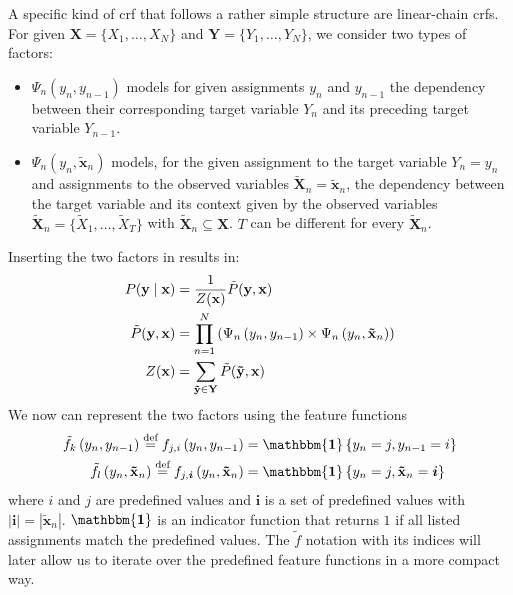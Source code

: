 A specific kind of \gls{crf} that follows a rather simple structure are \glspl{linear-chain crf}.
For given $\mathbf{X}=\{X_1,\dots,X_N\}$ and $\mathbf{Y}=\{Y_1,\dots,Y_N\}$, we consider two types of \glspl{factor}:
\begin{itemize}
  \item $\Psi_n(y_n,y_{n-1})$ models for given assignments $y_n$ and $y_{n-1}$ the dependency between their corresponding \gls{target variable} $Y_n$ and its preceding \gls{target variable} $Y_{n-1}$.
  \item $\Psi_n(y_n,\mathbf{\tilde{x}}_n)$ models, for the given assignment to the \gls{target variable} $Y_n=y_n$ and assignments to the observed variables $\mathbf{\tilde{X}}_n=\mathbf{\tilde{x}}_n$, the dependency between the \gls{target variable} and its context given by the \glspl{observed variable} $\mathbf{\tilde{X}}_n=\{\tilde{X}_1,\dots,\tilde{X}_T\}$ with $\mathbf{\tilde{X}}_n\subseteq\mathbf{X}$.
    $T$ can be different for every $\mathbf{\tilde{X}}_n$.
\end{itemize}
Inserting the two factors in  results in:
\begin{equation}
  \label{equ:linear-chain-crf-factor}
  \begin{split}
    P(\mathbf{y}\mid\mathbf{x}) & = \frac{1}{Z(\mathbf{x})}\tilde{P}(\mathbf{y},\mathbf{x}) \\
    \tilde{P}(\mathbf{y},\mathbf{x}) &= \prod_{n=1}^{N}\left(\Psi_n\left(\vphantom{\tilde{x}}y_n,y_{n-1}\right)\times\Psi_n\left(y_n,\mathbf{\tilde{x}}_n\right)\right) \\
    Z(\mathbf{x}) & = \sum_{\mathbf{\tilde{y}}\in\mathbf{Y}}\tilde{P}(\mathbf{\tilde{y}},\mathbf{x})
  \end{split}
\end{equation}
We now can represent the two \glspl{factor} using the \glspl{feature function}
\begin{equation}
  \label{equ:linear-chain-crf-feature-functions}
  \begin{split}
    \tilde{f}_k\left(\vphantom{\tilde{x}}y_n,y_{n-1}\right)\equalsdef f_{j,i}\left(\vphantom{\tilde{x}}y_n,y_{n-1}\right) & = \mathbf{\mathbbm{1}}\left\{\vphantom{\tilde{x}}y_n=j,y_{n-1}=i\right\}\\
    \tilde{f}_l\left(y_n,\mathbf{\tilde{x}}_n\right)\equalsdef f_{j,\bm{i}}\left( y_n,\mathbf{\tilde{x}}_n\right) & = \mathbf{\mathbbm{1}}\left\{y_n=j,\mathbf{\tilde{x}}_n=\bm{i}\right\}
  \end{split}
\end{equation}
where $i$ and $j$ are predefined values and $\bm{i}$ is a set of predefined values with $|\bm{i}|=|\mathbf{\tilde{x}}_n|$. $\mathbf{\mathbbm{1}}$ is an indicator function that returns $1$ if all listed assignments match the predefined values.
The $\tilde{f}$ notation with its indices will later allow us to iterate over the predefined \glspl{feature function} in a more compact way.

